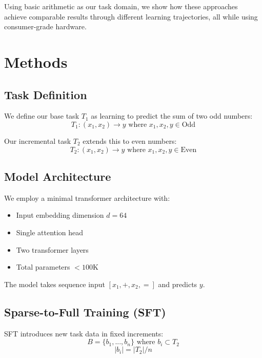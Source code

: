 \documentclass[11pt]{article}
\begin{document}
Using basic arithmetic as our task domain, we show how these approaches achieve comparable results through different learning trajectories, all while using consumer-grade hardware.

\section{Methods}

\subsection{Task Definition}
We define our base task $T_1$ as learning to predict the sum of two odd numbers:
\begin{equation}
    T_1: (x_1, x_2) \rightarrow y \text{ where } x_1, x_2, y \in \text{Odd}
\end{equation}

Our incremental task $T_2$ extends this to even numbers:
\begin{equation}
    T_2: (x_1, x_2) \rightarrow y \text{ where } x_1, x_2, y \in \text{Even}
\end{equation}

\subsection{Model Architecture}
We employ a minimal transformer architecture with:
\begin{itemize}
    \item Input embedding dimension $d = 64$
    \item Single attention head
    \item Two transformer layers
    \item Total parameters $< 100$K
\end{itemize}

The model takes sequence input $[x_1, +, x_2, =]$ and predicts $y$.

\subsection{Sparse-to-Full Training (SFT)}
SFT introduces new task data in fixed increments:
\begin{equation}
    B = \{b_1, ..., b_n\} \text{ where } b_i \subset T_2
\end{equation}
\begin{equation}
    |b_i| = |T_2|/n
\end{equation}
\end{document}
